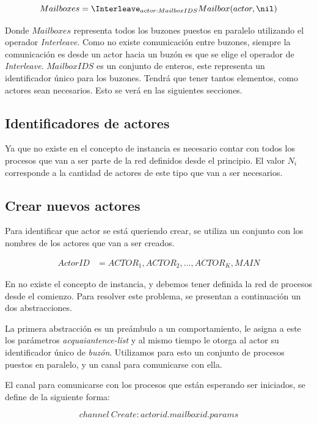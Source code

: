 \[
Mailboxes = \Interleave_{ actor : MailboxIDS } Mailbox(actor, \nil) 
\]

Donde $Mailboxes$ representa todos los buzones puestos en paralelo utilizando el operador \textit{Interleave}. Como no existe comunicación entre buzones, siempre la comunicación es desde un actor hacia un buzón es que se elige el operador de \textit{Interleave}. $MailboxIDS$ es un conjunto de enteros, este representa un identificador único para los buzones. Tendrá que tener tantos elementos, como actores sean necesarios. Esto se verá en las siguientes secciones. 


\subsection{Identificadores de actores}\label{model:id}

Ya que no existe en \CSP el concepto de instancia es necesario contar con todos los procesos que van a ser parte de la red definidos desde el principio. El valor $N_i$ corresponde a la cantidad de actores de este tipo que van a ser necesarios. 


\subsection{Crear nuevos actores}\label{modelo:crear}

Para identificar que actor se está queriendo crear, se utiliza un conjunto con los nombres de los actores que van a ser creados. 

\begin{align*}
  ActorID &= { ACTOR_1, ACTOR_2, \ldots, ACTOR_K, MAIN }
\end{align*}

En \CSP no existe el concepto de instancia, y debemos tener definida la red de procesos desde el comienzo. Para resolver este problema, se presentan a continuación un dos abstracciones.

La primera abstracción es un preámbulo a un comportamiento, le asigna a este los parámetros \textit{acquaiantence-list} y al mismo tiempo le otorga al actor su identificador único de \textit{buzón}. Utilizamos para esto un conjunto de procesos puestos en paralelo, y un canal para comunicarse con ella.

El canal para comunicarse con los procesos que están esperando ser iniciados, se define de la siguiente forma:

\[
channel\ Create:actorid.mailboxid.params
\]

